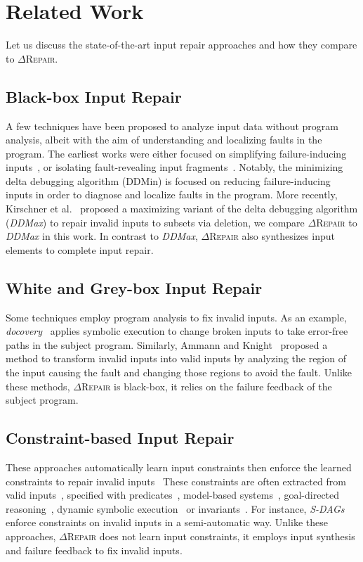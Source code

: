 \documentclass[acmsmall,screen,review,anonymous]{acmart}
\newcommand{\ddmin}{\textit{ddmin}\xspace}
\newcommand{\approach}{\textsc{$\Delta$Repair}\xspace}
\def\ddmin{DDMin\xspace}
\newcommand{\ddmax}{\textit{DDMax}\xspace}
\begin{document}
\section{Related Work}
\label{sec:relatedwork}

Let us discuss the state-of-the-art input repair approaches and how they compare to \approach. 

\subsection{Black-box Input Repair} 
A few techniques have been proposed to analyze input data without program analysis, albeit with the aim of understanding and localizing faults in the program. The earliest works were either focused on simplifying failure-inducing inputs~\cite{zeller2002simplifying, clause2009penumbra}, or isolating fault-revealing input fragments~\cite{hierarchicalDD, sterling2007automated}. Notably, the minimizing delta debugging algorithm (\ddmin) is focused on reducing failure-inducing inputs in order to diagnose and localize faults in the program. More recently, Kirschner et al.~\cite{kirschner2020debugging} proposed a maximizing variant of the delta debugging algorithm (\ddmax) to repair invalid inputs to subsets via deletion, we compare \approach to \ddmax in this work. In contrast to \ddmax, \approach also synthesizes input elements to complete input repair. 


\subsection{White and Grey-box Input Repair} Some techniques employ program analysis to fix invalid inputs. As an example, \emph{docovery}~\cite{docovery:ase14} applies symbolic execution to change broken inputs to take error-free paths in the subject program. Similarly, Ammann and Knight~\cite{data_diversity} proposed a method to transform invalid inputs into valid inputs by analyzing the region of the input causing the fault and changing those regions to avoid the fault. Unlike these methods, \approach 
is black-box, it relies on the failure feedback of the subject program. 


\subsection{Constraint-based Input Repair} %
These approaches automatically learn input constraints then enforce the learned constraints to repair invalid inputs~\cite{hussain2010dynamic, Demsky:2006:IED:1146238.1146266} 
These constraints are often extracted from valid inputs~\cite{Long:2012:AIR:2337223.2337233, Rinard:2007:LCZ:1297027.1297072}, specified with predicates~\cite{elkarablieh2008juzi}, model-based systems~\cite{Demsky:2003:ADR:949343.949314}, goal-directed reasoning~\cite{1553560}, dynamic symbolic execution~\cite{hussain2010dynamic} or invariants~\cite{Demsky:2006:IED:1146238.1146266}. For instance, \emph{S-DAGs}~\cite{scheffczyk2004s} enforce constraints on invalid inputs in a semi-automatic way. Unlike these approaches, \approach does not learn input constraints, it employs input synthesis and failure feedback to fix invalid inputs. 
\end{document}
